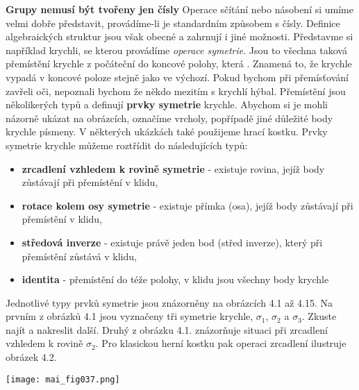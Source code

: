 \wikitextrule
\begin{example}\label{mai:exam051}
  \textbf{Grupy nemusí být tvořeny jen čísly}\newline\small
  Operace sčítání nebo násobení si umíme velmi dobře představit, provádíme-li je standardním 
  způsobem s čísly. Definice algebraických struktur jsou však obecné a zahrnují i jiné možnosti. 
  Představme si například krychli, se kterou provádíme \emph{operace symetrie}. Jsou to všechna 
  taková přemístění krychle z počáteční do koncové polohy, která . Znamená to, že 
  krychle vypadá v koncové poloze stejně jako ve výchozí. Pokud bychom při přemísťování zavřeli 
  oči, nepoznali bychom že někdo mezitím s krychlí hýbal. Přemístění jsou několikerých typů a 
  definují \textbf{prvky symetrie} krychle. Abychom si je mohli názorně ukázat na obrázcích, 
  označíme vrcholy, popřípadě jiné důležité body krychle písmeny. V některých ukázkách také 
  použijeme hrací kostku. Prvky symetrie krychle můžeme roztřídit do následujících typů:
  \begin{itemize}
    \item \textbf{zrcadlení vzhledem k rovině symetrie} - existuje rovina, jejíž body 
          zůstávají při přemístění v klidu,
    \item \textbf{rotace kolem osy symetrie} - existuje přímka (osa), jejíž body zůstávají 
          při přemístění v klidu,
    \item \textbf{středová inverze} - existuje právě jeden bod (střed inverze), který při 
          přemístění zůstává v klidu,
    \item \textbf{identita} - přemístění do téže polohy, v klidu jsou všechny body krychle
  \end{itemize}
  Jednotlivé typy prvků symetrie jsou znázorněny na obrázcích 4.1 až 4.15. Na prvním z obrázků 4.1 
  jsou vyznačeny tři symetrie krychle, \(\sigma_1\), \(\sigma_2\) a \(\sigma_3\). Zkuste najít a 
  nakreslit další. Druhý z obrázku 4.1. znázorňuje situaci při zrcadlení vzhledem k rovině 
  \(\sigma_2\). Pro klasickou herní kostku pak operaci zrcadlení ilustruje obrázek 4.2.
  
  {\centering
    \captionsetup{type=figure}
    \texttt{[image: mai\_fig037.png]}
    \par}
    

\end{example}
